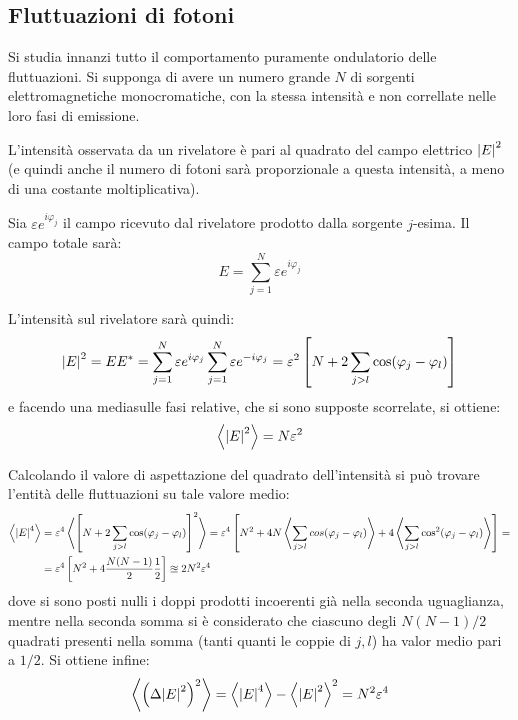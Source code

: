 \subsection{Fluttuazioni di fotoni}
\label{sec:fotonfluct}

Si studia innanzi tutto il comportamento puramente ondulatorio delle fluttuazioni. Si supponga di avere un numero grande $ N $ di sorgenti elettromagnetiche monocromatiche, con la stessa intensità e non correllate nelle loro fasi di emissione.

L'intensità osservata da un rivelatore è pari al quadrato del campo elettrico $ \abs{E}^2 $ (e quindi anche il numero di fotoni sarà proporzionale a questa intensità, a meno di una costante moltiplicativa).
\newline

Sia $ \varepsilon e^{i\varphi_j} $ il campo ricevuto dal rivelatore prodotto dalla sorgente $ j $-esima. Il campo totale sarà:
\[ E = \sum_{j = 1}^{N} \varepsilon e^{i\varphi_j} \]

L'intensità sul rivelatore sarà quindi:
\[  \abs{E}^2 = E E^\ast =  \sum_{j = 1}^{N} \varepsilon e^{i\varphi_j} \sum_{j = 1}^{N} \varepsilon e^{-i\varphi_j} = \varepsilon^2 \left[ N + 2 \sum_{j > l} \cos(\varphi_j - \varphi_l)\right] \]
e facendo una media\footnotemark sulle fasi relative, che si sono supposte scorrelate, si ottiene:
\[ \expval{\abs{E}^2} = N \varepsilon^2 \]

Calcolando il valore di aspettazione del quadrato dell'intensità si può trovare l'entità delle fluttuazioni su tale valore medio:
\begin{align*}
\expval{\abs{E}^4} &= \varepsilon^4 \expval{\left[ N +  2 \sum_{j > l} \cos(\varphi_j - \varphi_l) \right]^2} = \varepsilon^4 \left[ N^2 + 4 N \expval{\sum_{j > l} cos(\varphi_j - \varphi_l)} + 4 \expval{ \sum_{j > l} \cos^2(\varphi_j - \varphi_l)} \right] =\\
&= \varepsilon^4 \left[N^2 + 4 \frac{N(N - 1)}{2} \frac{1}{2}\right] \approxeq 2 N^2 \varepsilon^4
\end{align*}
dove si sono posti nulli i doppi prodotti incoerenti già nella seconda uguaglianza, mentre nella seconda somma si è considerato che ciascuno degli $ N(N-1)/2 $ quadrati presenti nella somma (tanti quanti le coppie di $ j,l $) ha valor medio pari a $ 1/2 $. Si ottiene infine:
\[ \expval{\left(\Delta\abs{E}^2\right)^2} = \expval{\abs{E}^4} - \expval{\abs{E}^2}^2 = N^2 \varepsilon^4\]

